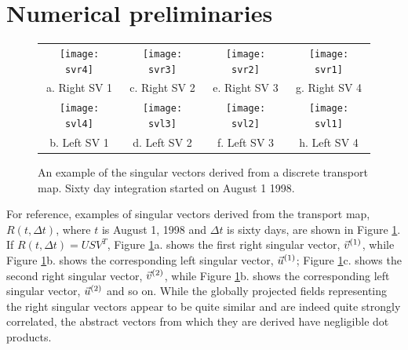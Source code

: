 \section{Numerical preliminaries}

\begin{figure}
  \begin{tabular}{cccc}
    \texttt{[image: svr4]} &
    \texttt{[image: svr3]} &
    \texttt{[image: svr2]} &
    \texttt{[image: svr1]} \\
    a. Right SV 1 & c. Right SV 2 & e. Right SV 3 & g. Right SV 4 \\
    \texttt{[image: svl4]} &
    \texttt{[image: svl3]} &
    \texttt{[image: svl2]} &
    \texttt{[image: svl1]} \\
    b. Left SV 1 & d. Left SV 2 & f. Left SV 3 & h. Left SV 4
  \end{tabular}
  \caption{An example of the singular vectors derived from a discrete transport map.
  Sixty day integration started on August 1 1998.}
  \label{sample_SV}
\end{figure}

For reference, examples of singular vectors derived from the transport map,
$R(t, \Delta t)$, where $t$ is August 1, 1998 and $\Delta t$ is sixty days,
are shown in Figure \ref{sample_SV}.
If $R(t, \Delta t)=U S V^T$,
Figure \ref{sample_SV}a. shows the first right singular vector, $\vec v^{(1)}$,
while Figure \ref{sample_SV}b. shows the corresponding left singular vector,
$\vec u^{(1)}$;
Figure \ref{sample_SV}c. shows the second right singular vector, $\vec v^{(2)}$,
while Figure \ref{sample_SV}b. shows the corresponding left singular vector,
$\vec u^{(2)}$
and so on.
While the globally projected fields representing the right singular vectors 
appear to be quite similar and are indeed
quite strongly correlated, the abstract vectors from which they are derived
have negligible dot products.

